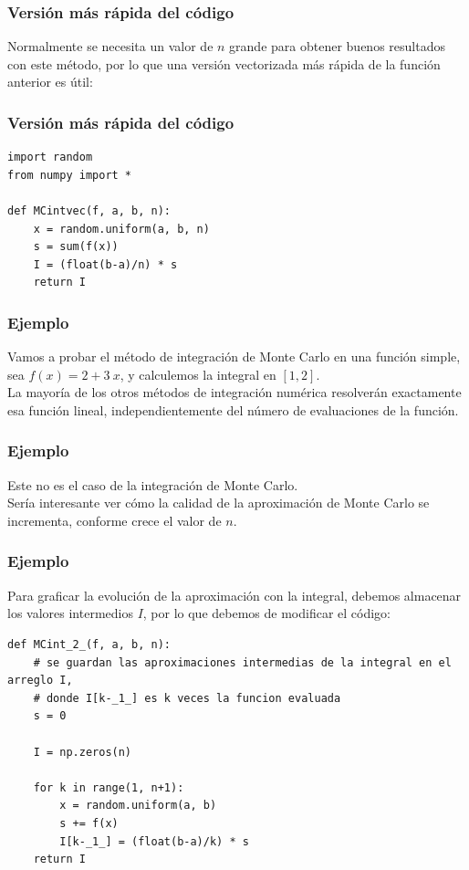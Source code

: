\begin{frame}[fragile]
\frametitle{Versión más rápida del código}
Normalmente se necesita un valor de $n$ grande para obtener buenos resultados con este método, por lo que una versión vectorizada más rápida de la función anterior es útil:
\end{frame}
\begin{frame}
\frametitle{Versión más rápida del código}
\begin{lstlisting}[caption=Función vectorizada para la aproximación de la integral, style=FormattedNumber, basicstyle=\linespread{1.1}\ttfamily=\small, columns=fullflexible]
import random
from numpy import *

def MCintvec(f, a, b, n):
    x = random.uniform(a, b, n)
    s = sum(f(x))
    I = (float(b-a)/n) * s
    return I
\end{lstlisting}
\end{frame}
\begin{frame}
\frametitle{Ejemplo}
Vamos a probar el método de integración de Monte Carlo en una función simple, sea $f(x) = 2 + 3 \: x$, y calculemos la integral en $[1, 2]$.
\\
\bigskip
La mayoría de los otros métodos de integración numérica resolverán exactamente esa función lineal, independientemente del número de evaluaciones de la función.
\end{frame}
\begin{frame}
\frametitle{Ejemplo}
Este no es el caso de la integración de Monte Carlo. 
\\
\bigskip
Sería interesante ver cómo la calidad de la aproximación de Monte Carlo se incrementa, conforme crece el valor de $n$.
\end{frame}
\begin{frame}
\frametitle{Ejemplo}
Para graficar la evolución de la aproximación con la integral, debemos almacenar los valores intermedios $I$, por lo que debemos de modificar el código:
\end{frame}
\begin{frame}
\begin{lstlisting}[caption=Código para el ejercicio, style=FormattedNumber, basicstyle=\linespread{1.1}\ttfamily=\small, columns=fullflexible]
def MCint_2_(f, a, b, n):
    # se guardan las aproximaciones intermedias de la integral en el arreglo I,
    # donde I[k-_1_] es k veces la funcion evaluada
    s = 0

    I = np.zeros(n)

    for k in range(1, n+1):
        x = random.uniform(a, b)
        s += f(x)
        I[k-_1_] = (float(b-a)/k) * s
    return I
\end{lstlisting}
\end{frame}
